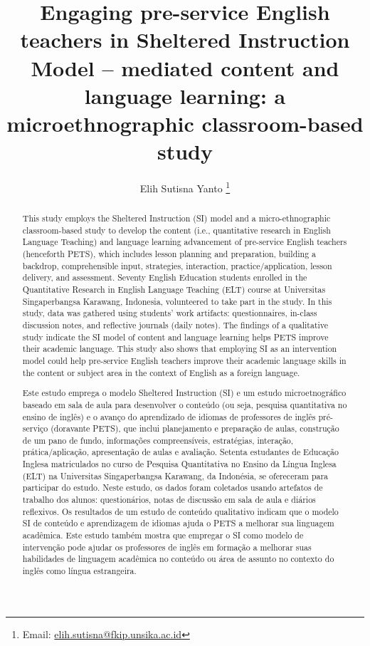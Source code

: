 \documentclass[english]{textolivre}
\title{Engaging pre-service English teachers in Sheltered Instruction Model – mediated content and language learning: a microethnographic classroom-based study}
\author[1]{Elih Sutisna Yanto \orcid{0000-0003-0701-6454} \thanks{Email: \href{mailto:elih.sutisna@fkip.unsika.ac.id}{elih.sutisna@fkip.unsika.ac.id}}}
\affil[1]{Universitas Singaperbangsa Karawang, Faculty of Teachers Training and Education, Department of English Education, Karawang, West-Java, Indonesia.}
\begin{document}
\maketitle

\begin{polyabstract}
\begin{abstract}
This study employs the Sheltered Instruction (SI) model and a micro-ethnographic classroom-based study to develop the content (i.e., quantitative research in English Language Teaching) and language learning advancement of pre-service English teachers (henceforth PETS), which includes lesson planning and preparation, building a backdrop, comprehensible input, strategies, interaction, practice/application, lesson delivery, and assessment. Seventy English Education students enrolled in the Quantitative Research in English Language Teaching (ELT) course at Universitas Singaperbangsa Karawang, Indonesia, volunteered to take part in the study. In this study, data was gathered using students' work artifacts: questionnaires, in-class discussion notes, and reflective journals (daily notes). The findings of a qualitative study indicate the SI model of content and language learning helps PETS improve their academic language. This study also shows that employing SI as an intervention model could help pre-service English teachers improve their academic language skills in the content or subject area in the context of English as a foreign language.

\end{abstract}

\begin{portuguese}
\begin{abstract}
Este estudo emprega o modelo Sheltered Instruction (SI) e um estudo microetnográfico baseado em sala de aula para desenvolver o conteúdo (ou seja, pesquisa quantitativa no ensino de inglês) e o avanço do aprendizado de idiomas de professores de inglês pré-serviço (doravante PETS), que inclui planejamento e preparação de aulas, construção de um pano de fundo, informações compreensíveis, estratégias, interação, prática/aplicação, apresentação de aulas e avaliação. Setenta estudantes de Educação Inglesa matriculados no curso de Pesquisa Quantitativa no Ensino da Língua Inglesa (ELT) na Universitas Singaperbangsa Karawang, da Indonésia, se ofereceram para participar do estudo. Neste estudo, os dados foram coletados usando artefatos de trabalho dos alunos: questionários, notas de discussão em sala de aula e diários reflexivos. Os resultados de um estudo de conteúdo qualitativo indicam que o modelo SI de conteúdo e aprendizagem de idiomas ajuda o PETS a melhorar sua linguagem acadêmica. Este estudo também mostra que empregar o SI como modelo de intervenção pode ajudar os professores de inglês em formação a melhorar suas habilidades de linguagem acadêmica no conteúdo ou área de assunto no contexto do inglês como língua estrangeira.


\end{abstract}
\end{portuguese}
\end{polyabstract}
\end{document}
